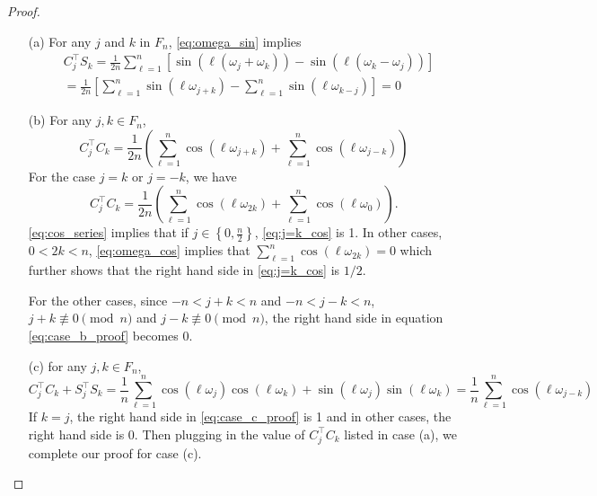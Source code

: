 \begin{lem}
\begin{proof}
\begin{enumerate}
\item[(a)] For any $j$ and $k$ in $F_n$, \eqref{eq:omega_sin} implies
\begin{equation}
\begin{aligned}
\label{eq:case_a_proof}
&C_j^\top S_k = \frac{1}{2n}\sum_{\ell=1}^n [\sin(\ell (\omega_j+\omega_k))-\sin(\ell (\omega_k-\omega_j))] \\
& = \frac{1}{2n}\left[\sum_{\ell=1}^n \sin(\ell \omega_{j+k}) - \sum_{\ell=1}^n \sin(\ell \omega_{k-j})\right] = 0
\end{aligned}
\end{equation}
\item[(b)] For any $j,k\in F_n$, 
\begin{equation}
\label{eq:case_b_proof}
C_j^\top C_k = \frac{1}{2n}\left(\sum_{\ell=1}^n \cos (\ell\omega_{j+k}) + \sum_{\ell=1}^n \cos (\ell\omega_{j-k})\right)
\end{equation}
For the case $j=k$ or $j=-k$, we have
\begin{equation}
\label{eq:j=k_cos}
C_j^\top C_k = \frac{1}{2n} \left(\sum_{\ell=1}^n\cos (\ell\omega_{2k}) + \sum_{\ell=1}^n \cos (\ell\omega_{0})\right).
\end{equation}
\eqref{eq:cos_series} implies that if $j \in \left\{ 0,\frac{n}{2}\right\}$, \eqref{eq:j=k_cos} is 1. In other cases, $0<2k<n$, \eqref{eq:omega_cos} implies that $\sum_{\ell=1}^n \cos(\ell\omega_{2k})=0$ which further shows that the right hand side in \eqref{eq:j=k_cos} is $1/2$. \par  

For the other cases, since $-n<j+k<n$ and $-n<j-k<n$, 
$j+k\not \equiv 0 \pmod{n}$ and $j-k \not \equiv 0 \pmod{n}$, the right hand side in equation \eqref{eq:case_b_proof} becomes 0. 
\item[(c)] for any $j,k\in F_n$, 
\begin{equation}
\label{eq:case_c_proof}
C_j^\top C_k + S_j^\top S_k = \frac{1}{n}\sum_{\ell=1}^n \cos (\ell\omega_j) \cos (\ell\omega_k) + \sin (\ell\omega_j)\sin (\ell\omega_k) = \frac{1}{n}\sum_{\ell=1}^n \cos (\ell\omega_{j-k})
\end{equation}
If $k=j$, the right hand side in \eqref{eq:case_c_proof} is 1 and in other cases, the right hand side is 0. Then plugging in  the value of $C_j^\top C_k$ listed in case (a), we complete  our proof for case (c). 
\end{enumerate}
\end{proof}
\end{lem}


